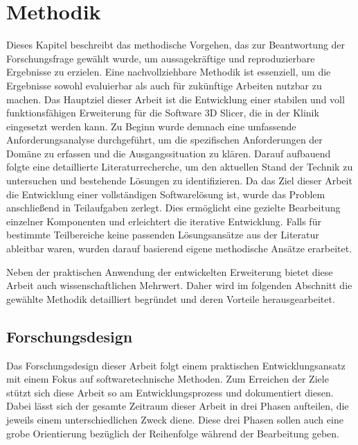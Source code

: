 \chapter{Methodik}
\label{chap:methodik} Dieses Kapitel beschreibt das methodische Vorgehen, das
zur Beantwortung der Forschungsfrage gewählt wurde, um aussagekräftige und reproduzierbare
Ergebnisse zu erzielen. Eine nachvollziehbare Methodik ist essenziell, um die Ergebnisse
sowohl evaluierbar als auch für zukünftige Arbeiten nutzbar zu machen. Das
Hauptziel dieser Arbeit ist die Entwicklung einer stabilen und voll
funktionsfähigen Erweiterung für die Software 3D Slicer, die in der Klinik eingesetzt
werden kann. Zu Beginn wurde demnach eine umfassende Anforderungsanalyse
durchgeführt, um die spezifischen Anforderungen der Domäne zu erfassen und die Ausgangssituation
zu klären. Darauf aufbauend folgte eine detaillierte Literaturrecherche, um den aktuellen
Stand der Technik zu untersuchen und bestehende Lösungen zu identifizieren. Da
das Ziel dieser Arbeit die Entwicklung einer vollständigen Softwarelösung ist, wurde
das Problem anschließend in Teilaufgaben zerlegt. Dies ermöglicht eine gezielte
Bearbeitung einzelner Komponenten und erleichtert die iterative Entwicklung. Falls
für bestimmte Teilbereiche keine passenden Lösungsansätze aus der Literatur ableitbar
waren, wurden darauf basierend eigene methodische Ansätze erarbeitet.

Neben der praktischen Anwendung der entwickelten Erweiterung bietet diese Arbeit
auch wissenschaftlichen Mehrwert. Daher wird im folgenden Abschnitt die gewählte
Methodik detailliert begründet und deren Vorteile herausgearbeitet.

\section{Forschungsdesign}
Das Forschungsdesign dieser Arbeit folgt einem praktischen Entwicklungsansatz mit
einem Fokus auf softwaretechnische Methoden. Zum Erreichen der Ziele stützt sich
diese Arbeit so am Entwicklungsprozess und dokumentiert diesen. Dabei lässt sich
der gesamte Zeitraum dieser Arbeit in drei Phasen aufteilen, die jeweils einem
unterschiedlichen Zweck diene. Diese drei Phasen sollen auch eine grobe Orientierung
bezüglich der Reihenfolge während der Bearbeitung geben.

